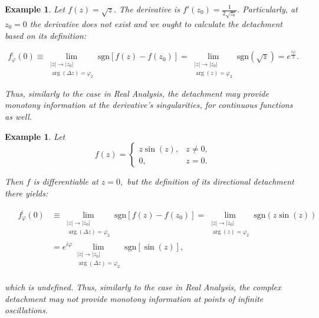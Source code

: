 \documentclass[11pt]{book}
\newtheorem{exm}[thm]{Example}
\begin{document}
\begin{exm}Let $f\left(z\right)=\sqrt{z}.$ The derivative is $f'\left(z_{0}\right)=\frac{1}{2\sqrt{z_{0}}}.$ Particularly, at $z_{0}=0$ the derivative does not exist and we ought to calculate the detachment based on its definition:

$$f_{\varphi}^{;}\left(0\right)\equiv\underset{\begin{array}{c}
\left|z\right|\to\left|z_{0}\right|\\
\arg\left(\Delta z\right)=\varphi_{2}
\end{array}}{\lim}\text{sgn}\left[f\left(z\right)-f\left(z_{0}\right)\right]=\underset{\begin{array}{c}
\left|z\right|\to\left|z_{0}\right|\\
\arg\left(z\right)=\varphi_{2}
\end{array}}{\lim}\text{sgn}\left(\sqrt{z}\right)=e^{\frac{i\varphi}{2}}.$$

Thus, similarly to the case in Real Analysis, the detachment may provide monotony information at the derivative's singularities, for continuous functions as well.
\end{exm}

\begin{exm}Let $$f\left(z\right)=\begin{cases}
z\sin\left(z\right), & z\neq0,\\
0, & z=0.
\end{cases}$$

Then $f$ is differentiable at $z=0,$ but the definition of its directional detachment there yields:

\begin{align}
&\begin{aligned}
f_{\varphi}^{;}\left(0\right)&\equiv\underset{\begin{array}{c}
\left|z\right|\to\left|z_{0}\right|\\
\arg\left(\Delta z\right)=\varphi_{2}
\end{array}}{\lim}\text{sgn}\left[f\left(z\right)-f\left(z_{0}\right)\right]=\underset{\begin{array}{c}
\left|z\right|\to\left|z_{0}\right|\\
\arg\left(z\right)=\varphi_{2}
\end{array}}{\lim}\text{sgn}\left(z\sin\left(z\right)\right) \\
&=e^{i\varphi}\underset{\begin{array}{c}
\left|z\right|\to\left|z_{0}\right|\\
\arg\left(\Delta z\right)=\varphi_{2}
\end{array}}{\lim}\text{sgn}\left[\sin\left(z\right)\right],
\end{aligned}
\end{align}

which is undefined. Thus, similarly to the case in Real Analysis, the complex detachment may not provide monotony information at points of infinite oscillations.
\end{exm}
\end{document}
